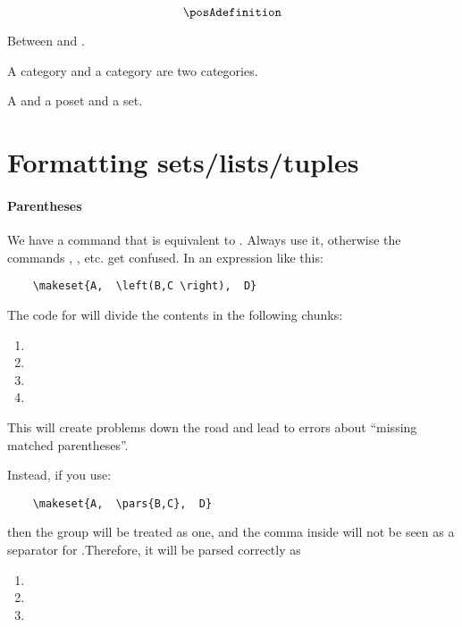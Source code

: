 \begin{equation}
    \posAdefinition
\end{equation}

Between \reals and \reals.

A category \Set and a category \SetL are two categories.

A  and a poset and a set.


\section{Formatting sets/lists/tuples}

\paragraph{Parentheses}

We have a command \str{\pars} that is equivalent to .
Always use it, otherwise the commands  \str{\makeset}, \str{\makelist}, etc. get confused.
In an expression like this:

\begin{verbatim}
    \makeset{A,  \left(B,C \right),  D}
\end{verbatim}

The code for \str{\makeset} will divide the contents in the following chunks:

\begin{enumerate}
    \item {}
    \item {}
    \item {}
    \item {}
\end{enumerate}
This will create problems down the road and lead to errors about ``missing matched parentheses''.

Instead, if you use:

\begin{verbatim}
    \makeset{A,  \pars{B,C},  D}
\end{verbatim}

then the group  will be treated as one, and the comma inside will not be seen as a separator for \str{\makeset}.Therefore, it will be parsed correctly as

\begin{enumerate}
    \item {}
    \item {}
    \item {}
\end{enumerate}

